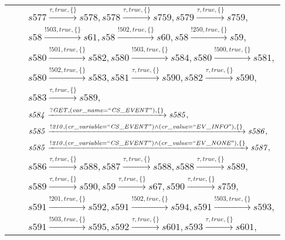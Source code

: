 \begin{tabular}{lcp{350px}}
& & $\mathit{s577}\xrightarrow{\mathit{\tau}, \mathit{true}, \{\}}\mathit{s578},\mathit{s578}\xrightarrow{\mathit{\tau}, \mathit{true}, \{\}}\mathit{s759},\mathit{s579}\xrightarrow{\mathit{\tau}, \mathit{true}, \{\}}\mathit{s759},$ \\
& & $\mathit{s58}\xrightarrow{\mathit{!503}, \mathit{true}, \{\}}\mathit{s61},\mathit{s58}\xrightarrow{\mathit{!502}, \mathit{true}, \{\}}\mathit{s60},\mathit{s58}\xrightarrow{\mathit{!250}, \mathit{true}, \{\}}\mathit{s59},$ \\
& & $\mathit{s580}\xrightarrow{\mathit{!501}, \mathit{true}, \{\}}\mathit{s582},\mathit{s580}\xrightarrow{\mathit{!503}, \mathit{true}, \{\}}\mathit{s584},\mathit{s580}\xrightarrow{\mathit{!500}, \mathit{true}, \{\}}\mathit{s581},$ \\
& & $\mathit{s580}\xrightarrow{\mathit{!502}, \mathit{true}, \{\}}\mathit{s583},\mathit{s581}\xrightarrow{\mathit{\tau}, \mathit{true}, \{\}}\mathit{s590},\mathit{s582}\xrightarrow{\mathit{\tau}, \mathit{true}, \{\}}\mathit{s590},$ \\
& & $\mathit{s583}\xrightarrow{\mathit{\tau}, \mathit{true}, \{\}}\mathit{s589},$ \\
& & $\mathit{s584}\xrightarrow{\mathit{?GET}, \mathit{(var\_name = ``CS\_EVENT")}, \{\}}\mathit{s585},$ \\
& & $\mathit{s585}\xrightarrow{\mathit{!210}, \mathit{(cr\_variable = ``CS\_EVENT") \land (cr\_value = ``EV\_INFO")}, \{\}}\mathit{s586},$ \\
& & $\mathit{s585}\xrightarrow{\mathit{!210}, \mathit{(cr\_variable = ``CS\_EVENT") \land (cr\_value = ``EV\_NONE")}, \{\}}\mathit{s587},$ \\
& & $\mathit{s586}\xrightarrow{\mathit{\tau}, \mathit{true}, \{\}}\mathit{s588},\mathit{s587}\xrightarrow{\mathit{\tau}, \mathit{true}, \{\}}\mathit{s588},\mathit{s588}\xrightarrow{\mathit{\tau}, \mathit{true}, \{\}}\mathit{s589},$ \\
& & $\mathit{s589}\xrightarrow{\mathit{\tau}, \mathit{true}, \{\}}\mathit{s590},\mathit{s59}\xrightarrow{\mathit{\tau}, \mathit{true}, \{\}}\mathit{s67},\mathit{s590}\xrightarrow{\mathit{\tau}, \mathit{true}, \{\}}\mathit{s759},$ \\
& & $\mathit{s591}\xrightarrow{\mathit{!201}, \mathit{true}, \{\}}\mathit{s592},\mathit{s591}\xrightarrow{\mathit{!502}, \mathit{true}, \{\}}\mathit{s594},\mathit{s591}\xrightarrow{\mathit{!503}, \mathit{true}, \{\}}\mathit{s593},$ \\
& & $\mathit{s591}\xrightarrow{\mathit{!503}, \mathit{true}, \{\}}\mathit{s595},\mathit{s592}\xrightarrow{\mathit{\tau}, \mathit{true}, \{\}}\mathit{s601},\mathit{s593}\xrightarrow{\mathit{\tau}, \mathit{true}, \{\}}\mathit{s601},$ \\

\end{tabular}
